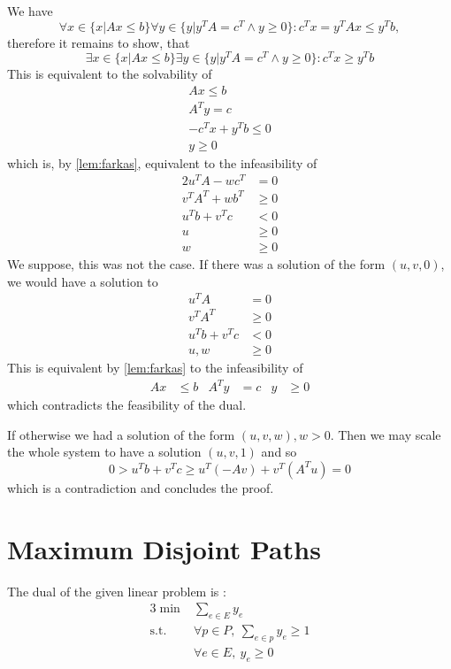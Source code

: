 \documentclass{scrartcl}
\newcommand\1{\mathbf{1}}
\begin{document}
\begin{Proof}
We have
\[
\forall x \in \{x|Ax\le b\} \forall y \in  \{y|y^TA = c^T \wedge y\ge 0\} \colon c^Tx =y^TAx \le y^Tb,
\]
therefore it remains to show, that 
\[
\exists x \in \{x|Ax\le b\} \exists y \in  \{y|y^TA = c^T \wedge y\ge 0\} \colon c^Tx\ge y^Tb
\]
This is equivalent to the solvability of
\begin{align*}
A x \le b\\
A^Ty = c\\
-c^Tx + y^Tb \le 0 \\
y \ge 0
\end{align*}
which is, by \autoref{lem:farkas}, equivalent to the infeasibility of
\begin{alignat*}{2}
u^TA - wc^T &= 0\\
 v^TA^T + wb^T &\ge 0\\
u^Tb+v^Tc &< 0 \\
 u &\ge 0\\
 w& \ge 0
 \end{alignat*}
We suppose, this was not the case. If there was a solution of the form $(u,v,0)$, we would have a solution to
\begin{align*}
u^TA &= 0\\
v^TA^T &\ge 0 \\
u^T b + v^T c& <0 \\
u, w &\ge 0
\end{align*}
This is equivalent by \autoref{lem:farkas} to the infeasibility of
\begin{align*}
Ax &\le b & A^Ty &= c &y&\ge 0
\end{align*}
which contradicts the feasibility of the dual.

If otherwise we had a solution of the form $(u,v,w), w >0$. Then we may scale the whole system to have a solution $(u,v,1)$ and so
\[
0 > u^T b + v^T c \ge u^T(-Av) + v^T (A^T u) = 0
\]
which is a contradiction and concludes the proof.
\end{Proof}

\section{Maximum Disjoint Paths}

The dual of the given linear problem is :
\begin{alignat*}{3}
\min & \sum_{e \in E} y_e\\
\text{s.t.} & \forall p \in P, \ \sum_{e \in p} y_e \geq 1\\
& \forall e \in E, \  y_e \geq 0
\end{alignat*}
\end{document}
